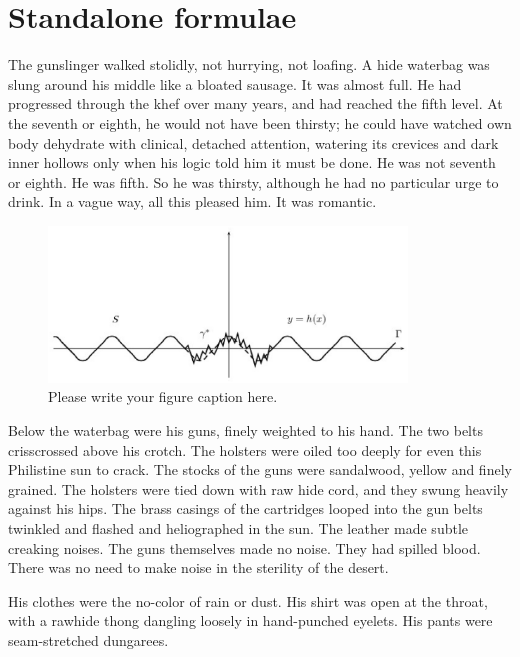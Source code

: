 \documentclass[
11pt,%
tightenlines,%
twoside,%
onecolumn,%
nofloats,%
nobibnotes,%
nofootinbib,%
superscriptaddress,%
noshowpacs,%
centertags]%
{revtex4}
\begin{document}
\section{Standalone formulae}

The gunslinger walked stolidly, not hurrying, not loafing. A hide waterbag was slung around his middle like a bloated sausage. It was almost full. He had progressed through the khef over many years, and had reached the fifth level. At the seventh or eighth, he would not have been thirsty; he could have watched own body dehydrate with clinical, detached attention, watering its crevices and dark inner hollows only when his logic told him it must be done. He was not seventh or eighth. He was fifth. So he was thirsty, although he had no particular urge to drink. In a vague way, all this pleased him. It was romantic.

\begin{figure}[h]
\setcaptionmargin{5mm}
\onelinecaptionstrue  %
\includegraphics[width=0.85\textwidth]{deform.eps}
\caption{Please write your figure caption here.}\label{fig:1}
\end{figure}

Below the waterbag were his guns, finely weighted to his hand. The two belts crisscrossed above his crotch. The holsters were oiled too deeply for even this Philistine sun to crack. The stocks of the guns were sandalwood, yellow and finely grained. The holsters were tied down with raw hide cord, and they swung heavily against his hips. The brass casings of the cartridges looped into the gun belts twinkled and flashed and heliographed in the sun. The leather made subtle creaking noises. The guns themselves made no noise. They had spilled blood. There was no need to make noise in the sterility of the desert.

His clothes were the no-color of rain or dust. His shirt was open at the throat, with a rawhide thong dangling loosely in hand-punched eyelets. His pants were seam-stretched dungarees.
\end{document}
